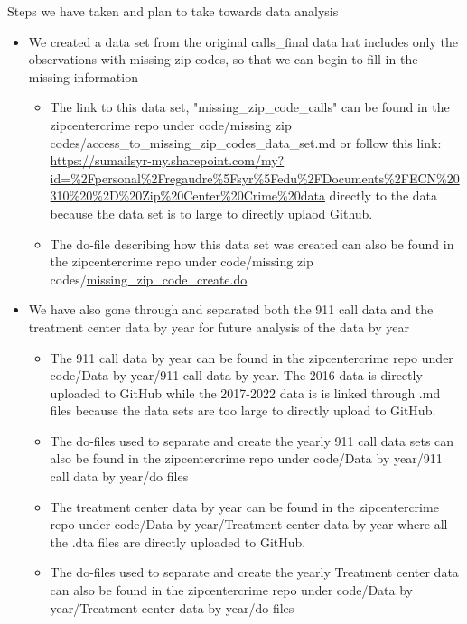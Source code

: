 \documentclass[12pt]{article}
\begin{document}
Steps we have taken and plan to take towards data analysis 
\begin{itemize}
    \item  We created a data set from the original calls\_final data hat includes only the observations with missing zip codes, so that we can begin to fill in the missing information
    \begin{itemize}
        \item The link to this data set, "missing\_zip\_code\_calls" can be found in the zipcentercrime repo under code/missing zip codes/access\_to\_missing\_zip\_codes\_data\_set.md or follow this link:  \url{https://sumailsyr-my.sharepoint.com/my?id=%2Fpersonal%2Fregaudre%5Fsyr%5Fedu%2FDocuments%2FECN%20310%20%2D%20Zip%20Center%20Crime%20data} directly to the data because the data set is to large to directly uplaod Github.
        \item The do-file describing how this data set was created can also be found in the zipcentercrime repo under code/missing zip codes/\href{https://github.com/ecn310/course-project-zipcentercrime/blob/main/Missing\%20zip\%20codes/missing_zip_code_create.do}{missing\_zip\_code\_create.do}  
    \end{itemize}
    \item We have also gone through and separated both the 911 call data and the treatment center data by year for future analysis of the data by year
    \begin{itemize}
        \item The 911 call data by year can be found in the zipcentercrime repo under code/Data by year/911 call data by year. The 2016 data is directly uploaded to GitHub while the 2017-2022 data is is linked through .md files because the data sets are too large to directly upload to GitHub.
        \item The do-files used to separate and create the yearly 911 call data sets can also be found in the zipcentercrime repo under code/Data by year/911 call data by year/do files
        \item The treatment center data by year can be found in the zipcentercrime repo under code/Data by year/Treatment center data by year where all the .dta files are directly uploaded to GitHub.
        \item The do-files used to separate and create the yearly Treatment center data can also be found in the zipcentercrime repo under code/Data by year/Treatment center data by year/do files
    \end{itemize}

\end{itemize}
\end{document}
